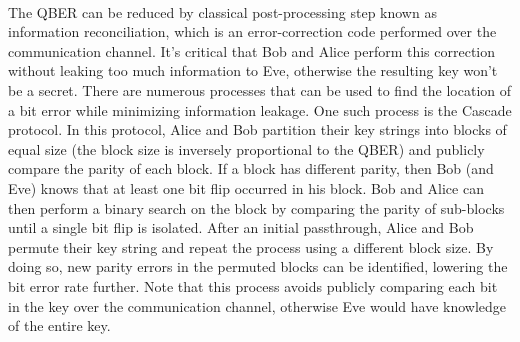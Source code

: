 \documentclass[12pt,a4paper]{article}
\begin{document}
	\paragraph{}
	The QBER can be reduced by classical post-processing step known as information reconciliation, which is an error-correction code performed over the communication channel. It's critical that Bob and Alice perform this correction without leaking too much information to Eve, otherwise the resulting key won't be a secret. There are numerous processes that can be used to find the location of a bit error while minimizing information leakage. One such process is the Cascade protocol. In this protocol, Alice and Bob partition their key strings into blocks of equal size (the block size is inversely proportional to the QBER) and publicly compare the parity of each block. If a block has different parity, then Bob (and Eve) knows that at least one bit flip occurred in his block. Bob and Alice can then perform a binary search on the block by comparing the parity of sub-blocks until a single bit flip is isolated. After an initial passthrough, Alice and Bob permute their key string and repeat the process using a different block size. By doing so, new parity errors in the permuted blocks can be identified, lowering the bit error rate further. Note that this process avoids publicly comparing each bit in the key over the communication channel, otherwise Eve would have knowledge of the entire key. %

 
\end{document}
